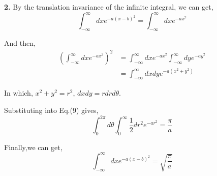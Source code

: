 \documentclass[a4paper]{article}
\begin{document}
\par\textbf{2.}
By the translation invariance of the infinite integral, we can get,
\begin{equation}
\int_{-\infty}^{\infty}{dxe^{-a(x-b)^2}}
    =\int_{-\infty}^{\infty}{dxe^{-ax^2}}
\end{equation}
\par And then,
\begin{equation}
   \begin{split}
     (\int_{-\infty}^{\infty}{dxe^{-ax^2}})^2
    &=\int_{-\infty}^{\infty}{dxe^{-ax^2}}\int_{-\infty}^{\infty}{dye^{-ay^2}}\\
    &=\int_{-\infty}^{\infty}{dxdye^{-a(x^2+y^2)}}
  \end{split}
\end{equation}
\par In which, $x^2+y^2=r^2$, $dxdy=rdrd\theta$.
\par Substituting into Eq.(9) gives,
\begin{equation}
    \nonumber\int_{0}^{2\pi}{d\theta}\int_{0}^{\infty}{\frac{1}{2}dr^2 e^{-ar^2}}=\frac{\pi}{a}
\end{equation}
\par Finally,we can get,
\begin{equation}
    \int_{-\infty}^{\infty}{dxe^{-a(x-b)^2}}=\sqrt{\frac{\pi}{a}}
\end{equation}
\end{document}
